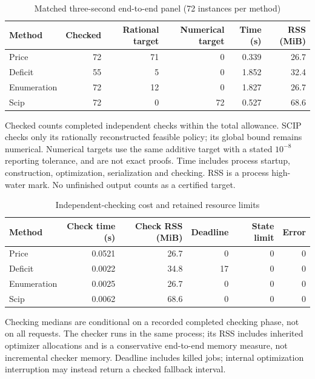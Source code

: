 \begin{table}[p]\centering\caption{Matched three-second end-to-end panel (72 instances per method)}\label{tab:study59}
\begin{tabular}{lrrrrr}\toprule
Method & Checked & Rational target & Numerical target & Time (s) & RSS (MiB)\\\midrule
Price & 72 & 71 & 0 & 0.339 & 26.7\\
Deficit & 55 & 5 & 0 & 1.852 & 32.4\\
Enumeration & 72 & 12 & 0 & 1.827 & 26.7\\
Scip & 72 & 0 & 72 & 0.527 & 68.6\\
\bottomrule\end{tabular}
\par\smallskip\begin{minipage}{\textwidth}\small Checked counts completed independent checks within the total allowance. SCIP checks only its rationally reconstructed feasible policy; its global bound remains numerical. Numerical targets use the same additive target with a stated $10^{-8}$ reporting tolerance, and are not exact proofs. Time includes process startup, construction, optimization, serialization and checking. RSS is a process high-water mark. No unfinished output counts as a certified target.\end{minipage}\end{table}
\begin{table}[p]\centering\caption{Independent-checking cost and retained resource limits}\label{tab:checking59}
\begin{tabular}{lrrrrr}\toprule
Method & Check time (s) & Check RSS (MiB) & Deadline & State limit & Error\\\midrule
Price & 0.0521 & 26.7 & 0 & 0 & 0\\
Deficit & 0.0022 & 34.8 & 17 & 0 & 0\\
Enumeration & 0.0025 & 26.7 & 0 & 0 & 0\\
Scip & 0.0062 & 68.6 & 0 & 0 & 0\\
\bottomrule\end{tabular}\par\smallskip\begin{minipage}{\textwidth}\small Checking medians are conditional on a recorded completed checking phase, not on all requests. The checker runs in the same process; its RSS includes inherited optimizer allocations and is a conservative end-to-end memory measure, not incremental checker memory. Deadline includes killed jobs; internal optimization interruption may instead return a checked fallback interval.\end{minipage}\end{table}
